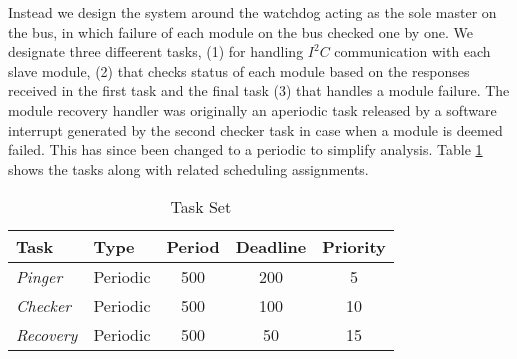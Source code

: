 Instead we design the system around the watchdog acting as the sole master on the bus, in which failure of each module on the bus checked one by one. We designate three diffeerent tasks, (1) for handling $\textit{I}^2\textit{C}$ communication with each slave module, (2) that checks status of each module based on the responses received in the first task and the final task (3) that handles a module failure. The module recovery handler was originally an aperiodic task released by a software interrupt generated by the second checker task in case when a module is deemed failed. This has since been changed to a periodic to simplify analysis. Table \ref{tab:tasks} shows the tasks along with related scheduling assignments.
\begin{center}
	\begin{table}
    \begin{tabular}{ | l | l | c | c | c |}
    \hline
    Task & Type & Period & Deadline & Priority  \\ \hline
    \textit{Pinger} & Periodic & 500 & 200 & 5  \\ \hline
    \textit{Checker} & Periodic & 500 & 100 & 10 \\ \hline
    \textit{Recovery} & Periodic & 500 & 50 &  15 \\
    \hline
    \end{tabular}
    \label{tab:tasks}
     \caption{Task Set}
    \end{table}
\end{center}

